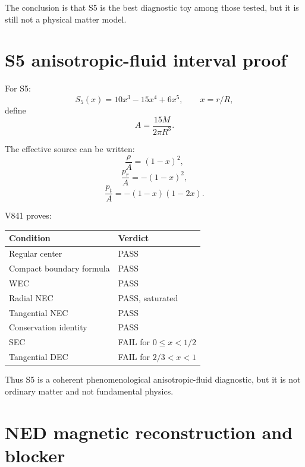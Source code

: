 \documentclass[11pt,a4paper]{article}
\begin{document}
The conclusion is that S5 is the best diagnostic toy among those tested, but it is still not a physical matter model.

\section{S5 anisotropic-fluid interval proof}

For S5:
\begin{equation}
S_5(x)=10x^3-15x^4+6x^5,\qquad x=r/R,
\end{equation}
define
\begin{equation}
A=\frac{15M}{2\pi R^3}.
\end{equation}

The effective source can be written:
\begin{equation}
\frac{\rho}{A}=(1-x)^2,
\end{equation}
\begin{equation}
\frac{p_r}{A}=-(1-x)^2,
\end{equation}
\begin{equation}
\frac{p_t}{A}=-(1-x)(1-2x).
\end{equation}

V841 proves:

\begin{center}
\begin{tabular}{ll}
\toprule
Condition & Verdict \\
\midrule
Regular center & PASS \\
Compact boundary formula & PASS \\
WEC & PASS \\
Radial NEC & PASS, saturated \\
Tangential NEC & PASS \\
Conservation identity & PASS \\
SEC & FAIL for $0\le x<1/2$ \\
Tangential DEC & FAIL for $2/3<x<1$ \\
\bottomrule
\end{tabular}
\end{center}

Thus S5 is a coherent phenomenological anisotropic-fluid diagnostic, but it is not ordinary matter and not fundamental physics.

\section{NED magnetic reconstruction and blocker}
\end{document}

